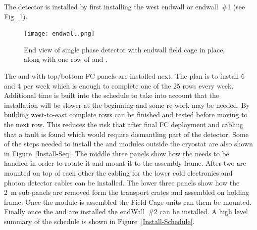 The  detector is installed by first installing the west endwall or
endwall~\#1 (see Fig.~\ref{fig:endwall}).
\begin{figure}[htbp]
\begin{center}
\texttt{[image: endwall.png]}
\caption{End view of single phase detector with endwall field cage in
  place, along with one row of  and .}
\label{fig:endwall}
\end{center}
\end{figure}
The  and  with top/bottom FC panels are
installed next. The plan is to install \num{6}  and \num{4}
 per week which is enough to complete one of the \num{25}
rows every week. Additional time is built into the schedule to take
into account that the installation will be slower at the beginning and
some re-work may be needed. By building west-to-east complete rows can
be finished and tested before moving to the next row. This reduces the
risk that after final FC deployment and cabling that a fault is found
which would require dismantling part of the detector. Some of the steps
needed to install the  and  modules outside the
cryostat are also shown in Figure~\ref{Install-Seq}.  The middle three
panels show how the  needs to be handled in order to rotate
it and mount it to the assembly frame. After two  are
mounted on top of each other the cabling for the lower 
cold electronics and photon detector cables can be installed. The
lower three panels show how the \SI{2}{m}  sub-panels are
removed form the transport crates and assembled on holding frame. Once
the  module is assembled the Field Cage units can them be
mounted. Finally once the  and  are installed
the endWall~\#2 can be installed. A high level summary of the schedule
is shown in Figure~\ref{Install-Schedule}.
